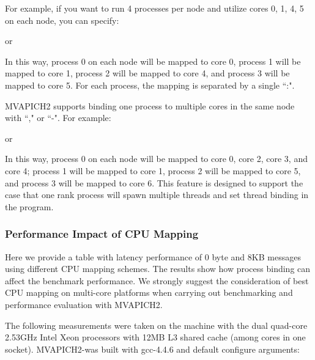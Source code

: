 For example, if you want to run 4 processes per node and utilize cores
0, 1, 4, 5 on each node, you can specify:


or


In this way, process 0 on each node will be mapped to core 0, process 1 will be
mapped to
core 1, process 2 will be mapped to core 4, and process 3 will be mapped to core
5.
For each process, the mapping is separated by a single ``:".

MVAPICH2 supports binding one process to multiple cores in the same node with ``," or ``-". For example:


or


In this way, process 0 on each node will be mapped to core 0, core 2, core 3, and core 4; process 1 will
be mapped to core 1, process 2 will be mapped to core 5, and process 3 will be mapped to core 6.
This feature is designed to support the case that one rank process will spawn multiple threads and set
thread binding in the program.

\subsubsection{Performance Impact of CPU Mapping}
\label{usage:perf_cpu_mapping}
Here we provide a table with latency performance of 0 byte and 8KB messages
using different CPU mapping schemes. The results show how process binding can
affect the benchmark performance. We strongly suggest the consideration of
best CPU
mapping on multi-core platforms
when carrying out benchmarking and performance evaluation with
MVAPICH2.

The following measurements were taken on the machine with the dual quad-core
2.53GHz Intel Xeon processors with 12MB L3 shared cache (among cores in one
socket). MVAPICH2-\mvapichrcversion was
built with gcc-4.4.6 and default configure arguments:

